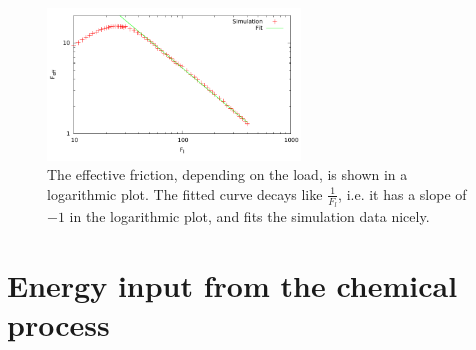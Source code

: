 \documentclass[aps,pre,onecolumn,showpacs,showkeys,a4paper]{revtex4}
\begin{document}
\begin{figure}[h]
\centering
\includegraphics[width=0.6\textwidth,height=!]{eff_frict_decay}
\caption{The effective friction, depending on the load, is shown in a logarithmic plot. The fitted curve decays like $\frac{1}{F_l}$, i.e. it has a slope of $-1$ in the logarithmic plot, and fits the simulation data nicely.}
\label{Fig: eff_frict_decay}
\end{figure}


\section{Energy input from the chemical process}
\end{document}
